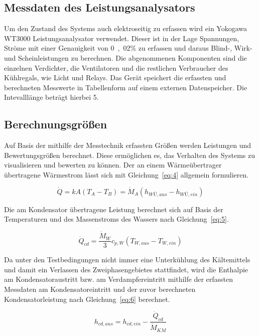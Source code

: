 \subsection{Messdaten des Leistungsanalysators}
\label{subsec:Messdaten des Leistungsanalysators}

Um den Zustand des Systems auch elektroseitig zu erfassen wird ein Yokogawa WT3000 Leistungsanalysator verwendet. Dieser ist in der Lage Spannungen, Ströme mit einer Genauigkeit von \unit{0,02}{\%} zu erfassen und daraus Blind-, Wirk- und Scheinleistungen zu berechnen. Die abgenommenen Komponenten sind die einzelnen Verdichter, die Ventilatoren und die restlichen Verbraucher des Kühlregals, wie Licht und Relays.
Das Gerät speichert die erfassten und berechneten Messwerte in Tabellenform auf einem externen Datenspeicher. Die Intevalllänge beträgt hierbei \unit{5}{\second}.


\subsection{Berechnungsgrößen}
\label{subsec:Berechnungsgrössen}

Auf Basis der mithilfe der Messtechnik erfassten Größen werden Leistungen und Bewertungsgrößen berechnet. Diese ermöglichen es, das Verhalten des Systems zu visualisieren und bewerten zu können.
Der an einem Wärmeübertrager übertragene Wärmestrom lässt sich mit Gleichung~\ref{eq:4} allgemein formulieren.

\begin{equation}
\label{eq:4}
\dot{Q}= kA(T_A - T_B) = \dot{M}_{A}(h_{WÜ,aus} - h_{WÜ,ein})
\end{equation}

Die am Kondensator übertragene Leistung berechnet sich auf Basis der Temperaturen und des Massenstroms des Wassers nach Gleichung~\ref{eq:5}.

\begin{equation}
\label{eq:5}
\dot{Q}_{cd}= \frac{\dot{M}_{W}}{3} c_{p,W} (T_{W,aus} - T_{W,ein})
\end{equation}

Da unter den Testbedingungen nicht immer eine Unterkühlung des Kältemittels und damit ein Verlassen des Zweiphasengebietes stattfindet, wird die Enthalpie am Kondensatoraustritt bzw. am Verdampfereintritt mithilfe der erfassten Messdaten am Kondensatoreintritt und der zuvor berechneten Kondensatorleistung nach Gleichung~\ref{eq:6} berechnet.

\begin{equation}
\label{eq:6}
h_{cd,aus} = h_{cd,ein} - \frac{\dot{Q}_{cd}}{\dot{M}_{KM}}
\end{equation}

